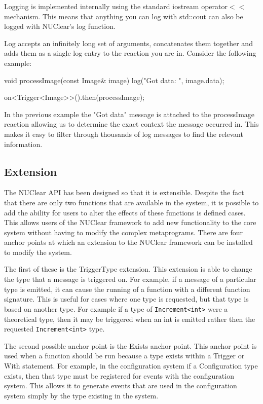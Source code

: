 \documentclass[english,12pt]{scrartcl}
\begin{document}
				Logging is implemented internally using the standard iostream operator$<<$ mechanism.
				This means that anything you can log with std::cout can also be logged with NUClear's log function.

				Log accepts an infinitely long set of arguments, concatenates them together and adds them as a single log entry to the reaction you are in.
				Consider the following example:

				\begin{cppcode}
					void processImage(const Image& image) {
					    log("Got data: ", image.data);
					}

					on<Trigger<Image>>().then(processImage);
				\end{cppcode}

				In the previous example the "Got data" message is attached to the processImage reaction allowing us to determine the exact context the message occurred in.
				This makes it easy to filter through thousands of log messages to find the relevant information.

		\subsection{Extension}
			The NUClear API has been designed so that it is extensible.
			Despite the fact that there are only two functions that are available in the system, it is possible to add the ability for users to alter the effects of these functions is defined cases.
			This allows users of the NUClear framework to add new functionality to the core system without having to modify the complex metaprograms.
			There are four anchor points at which an extension to the NUClear framework can be installed to modify the system.

			The first of these is the TriggerType extension.
			This extension is able to change the type that a message is triggered on.
			For example, if a message of a particular type is emitted, it can cause the running of a function with a different function signature.
			This is useful for cases where one type is requested, but that type is based on another type.
			For example if a type of \texttt{Increment<int>} were a theoretical type, then it may be triggered when an int is emitted rather then the requested \texttt{Increment<int>} type.

			The second possible anchor point is the Exists anchor point.
			This anchor point is used when a function should be run because a type exists within a Trigger or With statement.
			For example, in the configuration system if a Configuration type exists, then that type must be registered for events with the configuration system.
			This allows it to generate events that are used in the configuration system simply by the type existing in the system.
\end{document}
